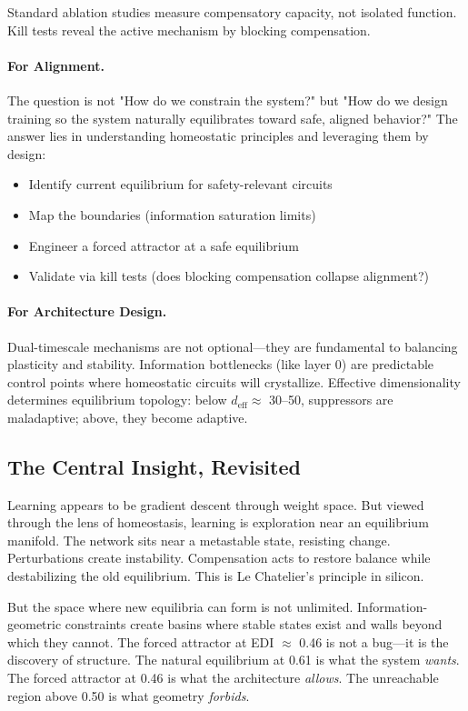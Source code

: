 Standard ablation studies measure compensatory capacity, not isolated function. Kill tests reveal the active mechanism by blocking compensation.

\paragraph{For Alignment.}
The question is not "How do we constrain the system?" but "How do we design training so the system naturally equilibrates toward safe, aligned behavior?" The answer lies in understanding homeostatic principles and leveraging them by design:
\begin{itemize}
\item Identify current equilibrium for safety-relevant circuits
\item Map the boundaries (information saturation limits)
\item Engineer a forced attractor at a safe equilibrium
\item Validate via kill tests (does blocking compensation collapse alignment?)
\end{itemize}

\paragraph{For Architecture Design.}
Dual-timescale mechanisms are not optional—they are fundamental to balancing plasticity and stability. Information bottlenecks (like layer 0) are predictable control points where homeostatic circuits will crystallize. Effective dimensionality determines equilibrium topology: below $d_{\text{eff}} \approx$ 30--50, suppressors are maladaptive; above, they become adaptive.

\subsection{The Central Insight, Revisited}

Learning appears to be gradient descent through weight space. But viewed through the lens of homeostasis, learning is exploration near an equilibrium manifold. The network sits near a metastable state, resisting change. Perturbations create instability. Compensation acts to restore balance while destabilizing the old equilibrium. This is Le Chatelier's principle in silicon.

But the space where new equilibria can form is not unlimited. Information-geometric constraints create basins where stable states exist and walls beyond which they cannot. The forced attractor at EDI $\approx$ 0.46 is not a bug—it is the discovery of structure. The natural equilibrium at 0.61 is what the system \emph{wants}. The forced attractor at 0.46 is what the architecture \emph{allows}. The unreachable region above 0.50 is what geometry \emph{forbids}.

